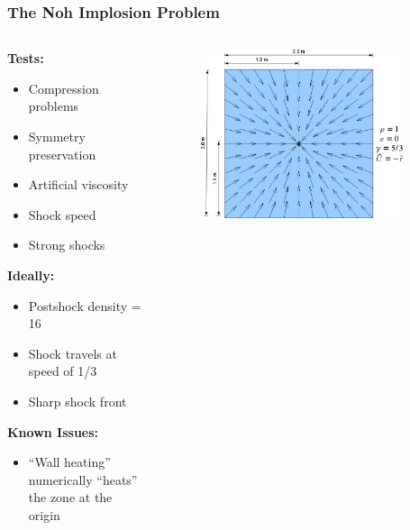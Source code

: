 \documentclass[8pt,xcolor=svgnames]{beamer}
\begin{document}
\begin{frame}
 \frametitle{The Noh Implosion Problem}
\begin{columns}
 \begin{column}{0.3\textwidth}
\textbf{Tests:}
  \begin{itemize}
   \item Compression problems
   \item Symmetry preservation
   \item Artificial viscosity
   \item Shock speed
   \item Strong shocks
  \end{itemize}

\textbf{Ideally:}
\begin{itemize}
 \item Postshock density = 16
 \item Shock travels at speed of 1/3
 \item Sharp shock front
\end{itemize}

\textbf{Known Issues:}
\begin{itemize}
 \item ``Wall heating'' numerically ``heats'' the zone at the origin
\end{itemize}

 \end{column}
 \begin{column}{0.7\textwidth}
    \begin{figure}[h!]
    \centering
    \includegraphics[width=0.9\textwidth,keepaspectratio=true]{./Images/NohImplosion.png}
    \end{figure}
 \end{column}
\end{columns}
\end{frame}
\end{document}

